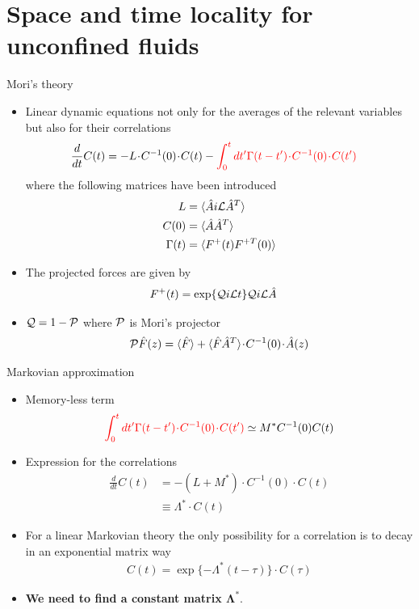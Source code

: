 \documentclass{beamer}
\newcommand{\esc}{\!\cdot\!}
\begin{document}
\section{Space and time locality for unconfined fluids}
\begin{frame}{Mori's theory}
  \begin{itemize}
    \item Linear dynamic equations not only for the averages of the relevant variables but also for their correlations
\begin{align}
  \frac{d}{dt}C(t)&=-L\esc C^{-1}(0)\esc C(t)
  -{\color{red}\int_0^tdt' \Gamma(t-t')\esc C^{-1}(0)\esc  C(t')}
\nonumber
\end{align}
where the following matrices have been introduced
\begin{align}
  L&=\langle \hat{A}i{\cal L}\hat{A}^T\rangle \nonumber \\
  C(0)&=\langle \hat{A}\hat{A}^T\rangle \nonumber \\
\Gamma(t)&=\langle F^+(t)F^{+T}(0)\rangle
\nonumber
\end{align}
\item The projected forces are given by
\begin{align}
F^+(t)&= \exp\{{\cal Q}i{\cal L}t\} {\cal Q}i{\cal L}\hat{A}  
\nonumber
\end{align}
\item ${\cal Q}=1-{\cal P}$ where  ${\cal P}$  is Mori's  projector 
\begin{align}
  {\cal P}\hat{F}(z) = \langle \hat{F}\rangle+ \langle \hat{F}\hat{A}^T \rangle\esc  C^{-1}(0)\esc  \hat{A}(z)
\nonumber
\end{align}
\end{itemize}
\end{frame}

\begin{frame}{Markovian approximation}
  \begin{itemize}
    \item Memory-less term 
  \begin{align}
{\color{red}\int_0^tdt' \Gamma(t-t')\esc C^{-1}(0)\esc  C(t')} \simeq M^* C^{-1}(0)C(t)
\nonumber
\end{align}
\item Expression for the correlations
\begin{align}
  \frac{d}{dt}C(t) &= - (L+M^*)\esc C^{-1}(0)\esc C(t) \nonumber \\
                     &\equiv \Lambda^*\esc C(t)
  \nonumber
\end{align}
\item For a linear Markovian theory the only possibility for a correlation is to decay in an exponential matrix way
\begin{align}
  C(t)=\exp\{-\Lambda^* (t-\tau)\}\esc C(\tau)
\nonumber
\end{align}
\item {\bf We need to find a constant matrix $\boldsymbol{\Lambda^*}$}.
\end{itemize}
\end{frame}
\end{document}
